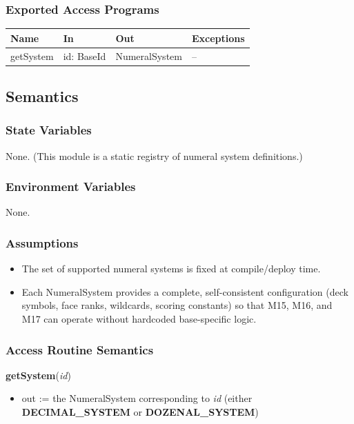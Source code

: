 \documentclass[12pt, titlepage]{article}
\begin{document}
\subsubsection{Exported Access Programs}

\begin{center}
\begin{tabular}{p{3.5cm} p{4cm} p{4cm} p{3.5cm}}
\toprule
\textbf{Name} & \textbf{In} & \textbf{Out} & \textbf{Exceptions} \\
\midrule
getSystem & id: BaseId & NumeralSystem & -- \\
\bottomrule
\end{tabular}
\end{center}

\subsection{Semantics}

\subsubsection{State Variables}
None. (This module is a static registry of numeral system definitions.)

\subsubsection{Environment Variables}
None.

\subsubsection{Assumptions}
\begin{itemize}
    \item The set of supported numeral systems is fixed at compile/deploy time.
    \item Each NumeralSystem provides a complete, self-consistent configuration (deck symbols, face ranks, wildcards, scoring constants) so that M15, M16, and M17 can operate without hardcoded base-specific logic.
\end{itemize}

\subsubsection{Access Routine Semantics}

\noindent\textbf{getSystem}(\textit{id})
\begin{itemize}
    \item out := the NumeralSystem corresponding to \textit{id} (either \textbf{DECIMAL\_SYSTEM} or \textbf{DOZENAL\_SYSTEM})
\end{itemize}
\end{document}
